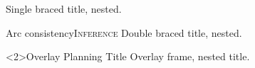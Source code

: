 \documentclass{ltx-talk}
\begin{document}
\begin{frame}[vertical-alignment=center]{}
Single braced title, nested.
\end{frame}

\begin{frame}[vertical-alignment=center]{Arc consistency}{{\scshape Inference}}
Double braced title, nested.
\end{frame}

\begin{frame}<2>{Overlay {Planning} Title}
Overlay frame, nested title.
\end{frame}
\end{document}
